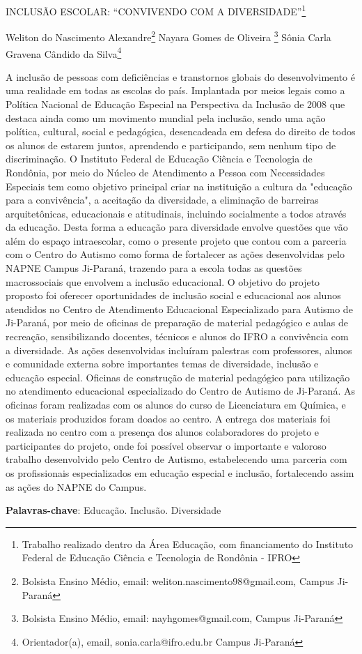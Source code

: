 \documentclass[article,12pt,onesidea,4paper,english,brazil]{abntex2}
\begin{document}
	
	
	\frenchspacing 
	
	\begin{center}
		\LARGE INCLUSÃO ESCOLAR: “CONVIVENDO COM A DIVERSIDADE”\footnote{Trabalho realizado dentro da Área Educação, com financiamento do Instituto Federal de Educação Ciência e Tecnologia de Rondônia - IFRO}
		
		\normalsize
		Weliton do Nascimento Alexandre\footnote{Bolsista Ensino Médio, email: weliton.nascimento98@gmail.com, Campus Ji-Paraná} 
		Nayara Gomes de Oliveira \footnote{Bolsista Ensino Médio, email: nayhgomes@gmail.com, Campus Ji-Paraná } 
		Sônia Carla Gravena Cândido da Silva\footnote{Orientador(a), email, sonia.carla@ifro.edu.br Campus Ji-Paraná}
	\end{center}
	
	\noindent 
	A inclusão de pessoas com deficiências e transtornos globais do desenvolvimento é uma realidade em todas as escolas do país.  Implantada por meios legais como a Política Nacional de Educação Especial na Perspectiva da Inclusão de 2008 que destaca ainda como um movimento mundial pela inclusão, sendo uma ação política, cultural, social e pedagógica, desencadeada em defesa do direito de todos os alunos de estarem juntos, aprendendo e participando, sem nenhum tipo de discriminação. O Instituto Federal de Educação Ciência e Tecnologia de Rondônia, por meio do Núcleo de Atendimento a Pessoa com Necessidades Especiais tem como objetivo principal criar na instituição a cultura da "educação para a convivência", a aceitação da diversidade, a eliminação de barreiras arquitetônicas, educacionais e atitudinais, incluindo socialmente a todos através da educação. Desta forma a educação para diversidade envolve questões que vão além do espaço intraescolar, como o presente projeto que contou com a parceria com o Centro do Autismo como forma de fortalecer as ações desenvolvidas pelo NAPNE Campus Ji-Paraná, trazendo para a escola todas as questões macrossociais que envolvem a inclusão educacional. O objetivo do projeto proposto foi oferecer oportunidades de inclusão social e educacional aos alunos atendidos no Centro de Atendimento Educacional Especializado para Autismo de Ji-Paraná, por meio de oficinas de preparação de material pedagógico e aulas de recreação, sensibilizando docentes, técnicos e alunos do IFRO a convivência com a diversidade. As ações desenvolvidas incluíram palestras com professores, alunos e comunidade externa sobre importantes temas de diversidade, inclusão e educação especial. Oficinas de construção de material pedagógico para utilização no atendimento educacional especializado do Centro de Autismo de Ji-Paraná. As oficinas foram realizadas com os alunos do curso de Licenciatura em Química, e os materiais produzidos foram doados ao centro. A entrega dos materiais foi realizada no centro com a presença dos alunos colaboradores do projeto e participantes do projeto, onde foi possível observar o importante e valoroso trabalho desenvolvido pelo Centro de Autismo, estabelecendo uma parceria com os profissionais especializados em educação especial e inclusão, fortalecendo assim as ações do NAPNE do Campus.
	
	
	\vspace{\onelineskip}
	
	\noindent
	\textbf{Palavras-chave}: Educação. Inclusão. Diversidade
	
\end{document}
